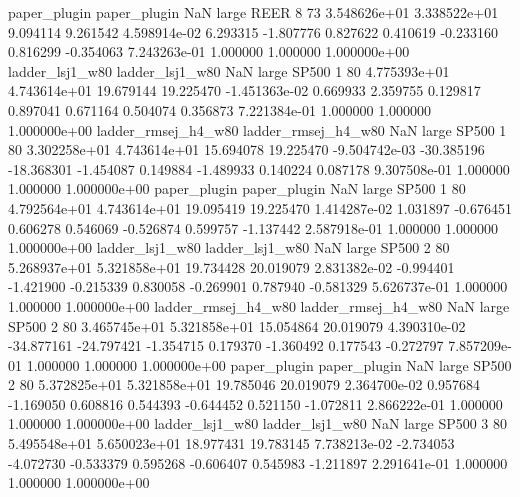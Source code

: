        paper_plugin        paper_plugin                   NaN      large     REER                 8 73 3.548626e+01   3.338522e+01      9.094114       9.261542  4.598914e-02      6.293315     -1.807776     0.827622       0.410619 -0.233160   0.816299    -0.354063   7.243263e-01            1.000000        1.000000        1.000000e+00
    ladder_lsj1_w80     ladder_lsj1_w80                   NaN      large    SP500                 1 80 4.775393e+01   4.743614e+01     19.679144      19.225470 -1.451363e-02      0.669933      2.359755     0.129817       0.897041  0.671164   0.504074     0.356873   7.221384e-01            1.000000        1.000000        1.000000e+00
ladder_rmsej_h4_w80 ladder_rmsej_h4_w80                   NaN      large    SP500                 1 80 3.302258e+01   4.743614e+01     15.694078      19.225470 -9.504742e-03    -30.385196    -18.368301    -1.454087       0.149884 -1.489933   0.140224     0.087178   9.307508e-01            1.000000        1.000000        1.000000e+00
       paper_plugin        paper_plugin                   NaN      large    SP500                 1 80 4.792564e+01   4.743614e+01     19.095419      19.225470  1.414287e-02      1.031897     -0.676451     0.606278       0.546069 -0.526874   0.599757    -1.137442   2.587918e-01            1.000000        1.000000        1.000000e+00
    ladder_lsj1_w80     ladder_lsj1_w80                   NaN      large    SP500                 2 80 5.268937e+01   5.321858e+01     19.734428      20.019079  2.831382e-02     -0.994401     -1.421900    -0.215339       0.830058 -0.269901   0.787940    -0.581329   5.626737e-01            1.000000        1.000000        1.000000e+00
ladder_rmsej_h4_w80 ladder_rmsej_h4_w80                   NaN      large    SP500                 2 80 3.465745e+01   5.321858e+01     15.054864      20.019079  4.390310e-02    -34.877161    -24.797421    -1.354715       0.179370 -1.360492   0.177543    -0.272797   7.857209e-01            1.000000        1.000000        1.000000e+00
       paper_plugin        paper_plugin                   NaN      large    SP500                 2 80 5.372825e+01   5.321858e+01     19.785046      20.019079  2.364700e-02      0.957684     -1.169050     0.608816       0.544393 -0.644452   0.521150    -1.072811   2.866222e-01            1.000000        1.000000        1.000000e+00
    ladder_lsj1_w80     ladder_lsj1_w80                   NaN      large    SP500                 3 80 5.495548e+01   5.650023e+01     18.977431      19.783145  7.738213e-02     -2.734053     -4.072730    -0.533379       0.595268 -0.606407   0.545983    -1.211897   2.291641e-01            1.000000        1.000000        1.000000e+00
